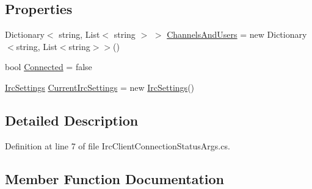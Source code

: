 \subsection*{Properties}
\begin{DoxyCompactItemize}
\item 
Dictionary$<$ string, List$<$ string $>$ $>$ \mbox{\hyperlink{class_little_weeb_library_1_1_event_arguments_1_1_irc_client_connection_status_args_a51cbce60bdb96d0b461d5a6e84940072}{Channels\+And\+Users}} = new Dictionary$<$string, List$<$string$>$$>$()
\item 
bool \mbox{\hyperlink{class_little_weeb_library_1_1_event_arguments_1_1_irc_client_connection_status_args_a4df4d6c89f98fcbe91ee1ecb40066a77}{Connected}} = false
\item 
\mbox{\hyperlink{class_little_weeb_library_1_1_settings_1_1_irc_settings}{Irc\+Settings}} \mbox{\hyperlink{class_little_weeb_library_1_1_event_arguments_1_1_irc_client_connection_status_args_a0cdd120909dbddabaa080c5a1dabb81d}{Current\+Irc\+Settings}} = new \mbox{\hyperlink{class_little_weeb_library_1_1_settings_1_1_irc_settings}{Irc\+Settings}}()
\end{DoxyCompactItemize}


\subsection{Detailed Description}


Definition at line 7 of file Irc\+Client\+Connection\+Status\+Args.\+cs.



\subsection{Member Function Documentation}
\mbox{\label{class_little_weeb_library_1_1_event_arguments_1_1_irc_client_connection_status_args_a71fdd09abcc607734be01125338fa928}} 
